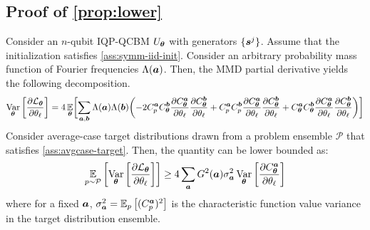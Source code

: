 \documentclass{article}
\theoremstyle{plain}
\theoremstyle{definition}
\theoremstyle{remark}
\begin{document}
\subsection{Proof of \cref{prop:lower}}
Consider an $n$-qubit IQP-QCBM $U_{\bm{\theta}}$ with generators $\{{\bm{s}^j}\}$. Assume that the initialization satisfies \cref{ass:symm-iid-init}. Consider an arbitrary probability mass function of Fourier frequencies $\Lambda({\bm{a}})$. Then, the MMD partial derivative yields the following decomposition.
\begin{equation}
\operatorname*{Var}_{{\bm{\theta}}} \left[ \frac{\partial \mathcal{L}_{\bm{\theta}}}{\partial \theta_\ell} \right] = 4 \operatorname*{\mathbb{E}}_{{\bm{\theta}}} \biggl[ \sum_{{\bm{a}}, {\bm{b}}} \Lambda({\bm{a}}) \Lambda({\bm{b}}) \biggl( \nonumber - 2C^{\bm{a}}_p C_{\bm{\theta}}^{\bm{b}} \frac{\partial C_{\bm{\theta}}^{\bm{a}}}{\partial \theta_\ell} \frac{\partial C_{\bm{\theta}}^{\bm{b}}}{\partial \theta_\ell} + 
 C^{\bm{a}}_p C^{\bm{b}}_p \frac{\partial C_{\bm{\theta}}^{\bm{a}}}{\partial \theta_\ell} \frac{\partial C_{\bm{\theta}}^{\bm{b}}}{\partial \theta_\ell} + C_{\bm{\theta}}^{\bm{a}} C_{\bm{\theta}}^{\bm{b}} \frac{\partial C_{\bm{\theta}}^{\bm{a}}}{\partial \theta_\ell} \frac{\partial C_{\bm{\theta}}^{\bm{b}}}{\partial \theta_\ell} \biggr) \biggr]
\end{equation}
Consider average-case target distributions drawn from a problem ensemble $\mathcal{P}$ that satisfies \cref{ass:avgcase-target}. Then, the quantity can be lower bounded as:
\begin{equation}
\operatorname*{\mathbb{E}}_{p\sim\mathcal{P}} \left[\operatorname*{Var}_{{\bm{\theta}}} \left[ \frac{\partial \mathcal{L}_{\bm{\theta}}}{\partial \theta_\ell} \right]\right] \geq
4 \sum_{\bm{a}} G^2({\bm{a}})\sigma_{\bm{a}}^2\operatorname*{Var}_{{\bm{\theta}}} \left[ \frac{\partial C^{\bm{a}}_{\bm{\theta}}}{\partial \theta_\ell} \right]
\end{equation}
where for a fixed ${\bm{a}}$, $\sigma_{\bm{a}}^2 =\operatorname*{\mathbb {E}}_{p}\left[(C_p^{{\bm{a}}})^2\right]$ is the characteristic function value variance in the target distribution ensemble.
\end{document}
